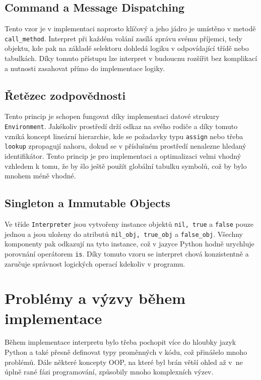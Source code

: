 \documentclass[a4paper,12pt]{article}
\begin{document}
\subsection{Command a Message Dispatching}
Tento vzor je v implementaci naprosto klíčový a jeho jádro je umístěno v metodě \texttt{call\_method}.
Interpret při každém volání zasílá zprávu svému příjemci, tedy objektu, kde pak na základě selektoru dohledá logiku v
odpovídající třídě nebo tabulkách. Díky tomuto přístupu lze interpret v budoucnu rozšířit bez komplikací a nutnosti zasahovat přímo
do implementace logiky.

\subsection{Řetězec zodpovědnosti}
Tento princip je schopen fungovat díky implementaci datové strukury \texttt{Environment}. Jakékoliv prostředí drží odkaz na svého
rodiče a díky tomuto vzniká koncept lineární hierarchie, kde se požadavky typu \texttt{assign} nebo třeba \texttt{lookup} zpropagují
nahoru, dokud se v příslušném prostředí nenalezne hledaný identifikátor. Tento princip je pro implementaci a optimalizaci velmi vhodný
vzhledem k tomu, že by šlo ještě použít globální tabulku symbolů, což by bylo mnohem méně vhodné.

\subsection{Singleton a Immutable Objects}
Ve tříde \texttt{Interpreter} jsou vytvořeny instance objektů \texttt{nil, true} a \texttt{false} pouze jednou a jsou 
uloženy do atributů \texttt{nil\_obj, true\_obj} a \texttt{false\_obj}. Všechny komponenty pak odkazují na tyto instance, což
v jazyce Python hodně urychluje porovnání operátorem \texttt{is}. Díky tomuto vzoru se interpret chová konzistentně a zaručuje
správnost logických operací kdekoliv v programu.

\section{Problémy a výzvy během implementace}
Během implementace interpretu bylo třeba pochopit více do hloubky jazyk Python a také přesně definovat typy
proměnných v kódu, což přinášelo mnoho problémů. Dále některé koncepty OOP, na které byl brán větší ohled 
až v~ne úplně rané fázi programování, způsobily mnoho komplexních výzev.
\end{document}
